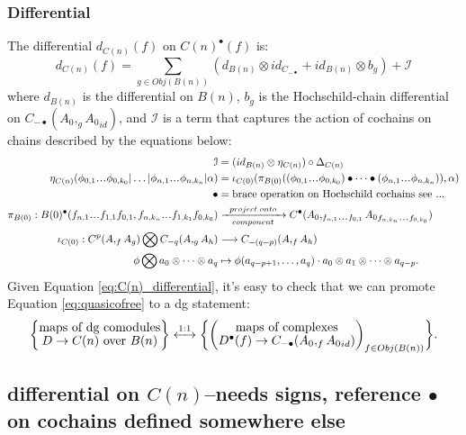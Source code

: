 \subsubsection{Differential}
The differential $d_{C(n)}(f)$ on $C(n)^\bullet(f)$ is: 
%
\begin{equation} \label{eq:C(n)_differential}
d_{C(n)}(f) = 
\sum\limits_{g \in Obj(B(n))} 
(d_{B(n)} \otimes id_{C_{-\bullet}}
+ id_{ B(n)}\otimes b_g)
+ \mathcal{I}
\end{equation}
%
where $d_{B(n)}$ is the differential on $B(n)$, 
$b_g$ is the Hochschild-chain differential on 
$C_{-\bullet}(A_0, _g{A_0}_{id})$, 
and $\mathcal{I}$ is a term that captures the action of cochains on chains 
described by the equations below:
%
\begin{equation}\label{eq:action_term}
\begin{split}
\mathcal{I} 
&= 
(id_{B(n)} \otimes \eta_{C(n)})
  \circ \Delta_{C(n)}\\
\eta_{C(n)}(
\phi_{0,1}\smdots\phi_{0,k_0} | \dots |
\phi_{n,1}\smdots\phi_{n,k_n} | \alpha)
&= 
\iota_{C(0)}( \pi_{B(0)}( 
(\phi_{0,1}\smdots \phi_{0,k_0}) \bullet \dots \bullet
(\phi_{n,1}\smdots \phi_{n,k_n})), \alpha)\\
\bullet
&= 
\textrm{brace operation on Hochschild cochains see ...}\\
\pi_{B(0)}: 
B(0)^\bullet
(f_{n,1}\smdots f_{1,1} f_{0,1}, 
f_{n,k_n}\smdots f_{1,k_1} f_{0,k_0})
&\xrightarrow[component]{project\;onto}
C^\bullet(A_0, _{f_{n,1}\smdots f_{0,1}}{A_0}_{f_{n,k_n}\smdots f_{0,k_0}})\\
\iota_{C(0)}: C^p(A, _fA_g) \bigotimes C_{-q}(A, _gA_h) 
&\longrightarrow 
C_{-(q-p)}(A, _fA_h) \\
\phi \bigotimes a_0\otimes \dots \otimes a_q 
&\mapsto 
\phi(a_{q-p+1},\dots,a_q)\cdot a_0 
\otimes a_1 \otimes \dots \otimes a_{q-p}.
\end{split}
\end{equation}
%
Given Equation \ref{eq:C(n)_differential}, 
it's easy to check that we can promote 
Equation \ref{eq:quasicofree} to a dg statement:
%
\begin{equation*}
\bigg\{ \let\scriptstyle\textstyle
\substack{\textrm{maps of dg comodules}\\
  D \to C(n)\textrm{ over }B(n)} 
\bigg\}
\overset{1:1}{\longleftrightarrow}
\bigg\{ \bigg( \let\scriptstyle\textstyle
\substack{\textrm{maps of complexes}\\
  D^\bullet(f) \to C_{-\bullet}(A_0, _f{A_0}_{id})}
\bigg)_{f \in Obj(B(n))} \bigg\}.
\end{equation*}
%
\subsection{differential on $C(n)$--needs signs, 
reference $\bullet$ on cochains defined somewhere else}